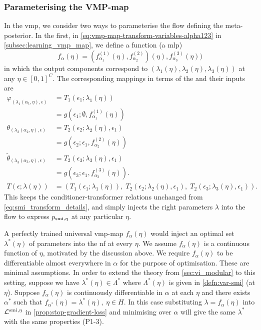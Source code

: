 \subsubsection{Parameterising the VMP-map}
In the \acrshort*{vmp}, we consider two ways to parameterise the flow defining the meta-posterior.
In the first, in \cref{eq:vmp-map-transform-variables-alpha123} in \cref{subsec:learning_vmp_map}, we define a function (a \acrshort*{mlp}) \[f_\alpha(\eta)=(f^{(1)}_{\alpha_1}(\eta),f^{(2)}_{\alpha_2})(\eta),f^{(3)}_{\alpha_3}(\eta))\] in which the output components correspond to $(\lambda_1(\eta),\lambda_2(\eta),\lambda_3(\eta))$ at any $\eta\in [0,1]^C$. The corresponding mappings in terms of the  and their inputs are
\begin{align}
\varphi_{(\lambda_1(\alpha_1,\eta),\epsilon)}&=T_1(\epsilon_1;\lambda_1(\eta))\nonumber\\
&=g(\epsilon_1;\emptyset,f^{(1)}_{\alpha_1}(\eta))\nonumber\\
\theta_{(\lambda_2(\alpha_2,\eta),\epsilon)}&=T_2(\epsilon_2;\lambda_2(\eta),\epsilon_1)\nonumber\\
&=g(\epsilon_2;\epsilon_1,f^{(2)}_{\alpha_2}(\eta))\nonumber\\
\tilde\theta_{(\lambda_3(\alpha_3,\eta),\epsilon)}&=T_2(\epsilon_3;\lambda_3(\eta),\epsilon_1)\nonumber\\
&=g(\epsilon_3;\epsilon_1,f^{(3)}_{\alpha_3}(\eta)).\nonumber\\
T(\epsilon; \lambda(\eta))                & = \left( T_1(\epsilon_1;\lambda_1(\eta)) ,\; T_2(\epsilon_2;\lambda_2(\eta), \epsilon_1) ,\; T_2(\epsilon_3;\lambda_3(\eta), \epsilon_1) \right). \label{eq:vmp-map-transform-variables-alpha123_details}
\end{align}
This keeps the conditioner-transformer relations unchanged from \cref{eq:smi_transform_details}, and simply injects the right parameters $\lambda$ into the flow to express $p_{\operatorname{\text{smi}},\eta}$ at any particular $\eta$.

A perfectly trained universal \acrshort*{vmp}-map $f_\alpha(\eta)$ would inject an optimal set $\lambda^*(\eta)$ of parameters into the \acrlong*{nf} at every $\eta$. 
We assume $f_{\alpha}(\eta)$ is a continuous function of $\eta$, motivated by the discussion above. We require $f_{\alpha}(\eta)$ to be differentiable almost everywhere in $\alpha$ for the purpose of optimisation. These are minimal assumptions. %
In order to extend the theory from \cref{sec:vi_modular} to this setting, suppose we have $\lambda^*(\eta)\in \Lambda^*$ where $\Lambda^*(\eta)$ is given in \cref{defn:var-smi} (at $\eta$). Suppose $f_\alpha(\eta)$ is continuously differentiable in $\alpha$ at each $\eta$ and there exists $\alpha^*$ such that $f_{\alpha^*}(\eta)=\lambda^*(\eta),\ \eta\in H$. In this case substituting $\lambda=f_{\alpha}(\eta)$ into $\mathcal{L}^{\operatorname{\text{smi}},\eta}$ in \cref{prop:stop-gradient-loss} and minimising over $\alpha$ will give the same $\lambda^*$ with the same properties (P1-3).

